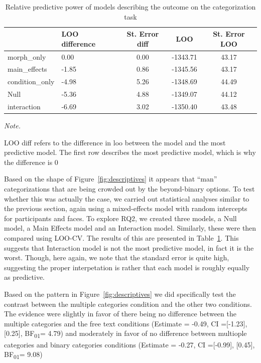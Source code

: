 \documentclass[
  man]{apa7}
\begin{document}
\begin{table}

\caption{\label{tab:rq2-table}Relative predictive power of models describing the outcome on the categorization task}
\centering
\begin{threeparttable}
\begin{tabular}[t]{llccc}
\toprule
  & LOO difference & St. Error diff & LOO & St. Error LOO\\
\midrule
morph\_only & 0.00 & 0.00 & -1343.71 & 43.17\\
main\_effects & -1.85 & 0.86 & -1345.56 & 43.17\\
condition\_only & -4.98 & 5.26 & -1348.69 & 44.49\\
Null & -5.36 & 4.88 & -1349.07 & 44.12\\
interaction & -6.69 & 3.02 & -1350.40 & 43.48\\
\bottomrule
\end{tabular}
\begin{tablenotes}[para]
\item \textit{Note.} 
\item LOO diff refers to the difference in loo between the model and the most predictive model. The first row describes the most predictive model, which is why the difference is 0
\end{tablenotes}
\end{threeparttable}
\end{table}

Based on the shape of Figure~\ref{fig:descriptives} it appears that ``man'' categorizations that are being crowded out by the beyond-binary options. To test whether this was actually the case, we carried out statistical analyses similar to the previous section, again using a mixed-effects model with random intercepts for participants and faces. To explore RQ2, we created three models, a Null model, a Main Effects model and an Interaction model. Similarly, these were then compared using LOO-CV. The results of this are presented in Table~\ref{tab:rq2-table}. This suggests that Interaction model is not the most predictive model, in fact it is the worst. Though, here again, we note that the standard error is quite high, suggesting the proper interpetation is rather that each model is roughly equally as predictive.

Based on the pattern in Figure~\ref{fig:descriptives} we did specifically test the contrast between the multiple categories condition and the other two conditions. The evidence were slightly in favor of there being no difference between the multiple categories and the free text conditions (Estimate = -0.49, CI ={[}-1.23{]}, {[}0.25{]}, BF\textsubscript{01}= 4.79) and moderately in favor of no difference between multiople categories and binary categories conditions (Estimate = -0.27, CI ={[}-0.99{]}, {[}0.45{]}, BF\textsubscript{01}= 9.08)
\end{document}
